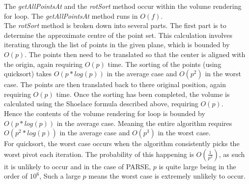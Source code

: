The \textit{getAllPointsAt} and the \textit{rotSort} method occur within the volume rendering for loop. The  \textit{getAllPointsAt} method runs in  $O(f)$.\\

The \textit{rotSort} method is broken down into several parts. The first part is to determine the approximate centre of the point set. This calculation involves iterating through the list of points in the given plane, which is bounded by $O(p)$. The points then need to be translated so that the center is aligned with the origin, again requiring $O(p)$ time. The sorting of the points (using quicksort) takes $O(p * log(p))$ in the average case and $O(p^2)$ in the worst case. The points are then translated back to there original position, again requiring $O(p)$ time. Once the sorting has been completed, the volume is calculated using the Shoelace formula described above, requiring $O(p)$.\\

Hence the contents of the volume rendering for loop is bounded by $O(p * log(p))$ in the average case. Meaning the entire algorithm requires $O(p^2 * log(p))$ in the average case and $O(p^3)$ in the worst case. \\

For quicksort, the worst case occurs when the algorithm consistently picks the worst pivot each iteration. The probability of this happening is $O(\frac{1}{p^2})$, as such it is unlikely to occur and in the case of PARSE, $p$ is quite large being in the order of $10^6$, Such a large $p$ means the worst case is extremely unlikely to occur.